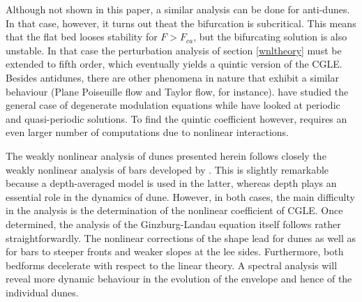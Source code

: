 \documentclass[12pt,a4paper,twocolumn,fleqn]{narms}
\begin{document}
Although not shown in this paper, a similar analysis can be done for
anti-dunes. In that case, however, it turns out theat the bifurcation
is subcritical. This means that the flat bed looses stability for
$F>F_{ca}$, but the bifurcating solution is also unstable. In that
case the perturbation analysis of section \ref{wnltheory} must be
extended to fifth order, which eventually yields a quintic version of
the CGLE.  Besides antidunes, there are other phenomena in nature that
exhibit a similar behaviour (Plane Poiseuille flow and Taylor flow,
for instance).  have studied the general case of
degenerate modulation equations while  have looked at
periodic and quasi-periodic solutions. To find the quintic coefficient
however, requires an even larger number of computations due to
nonlinear interactions.

The weakly nonlinear analysis of dunes presented herein follows
closely the weakly nonlinear analysis of bars developed by
. This is slightly remarkable because a
depth-averaged model is used in the latter, whereas depth plays an
essential role in the dynamics of dune. However, in both cases, the
main difficulty in the analysis is the determination of the nonlinear
coefficient of CGLE. Once determined, the analysis of the
Ginzburg-Landau equation itself follows rather straightforwardly.  The
nonlinear corrections of the shape lead for dunes as well as for bars
to steeper fronts and weaker slopes at the lee sides. Furthermore,
both bedforms decelerate with respect to the linear theory.  A
spectral analysis will reveal more dynamic behaviour in the evolution
of the envelope and hence of the individual dunes.




\end{document}
